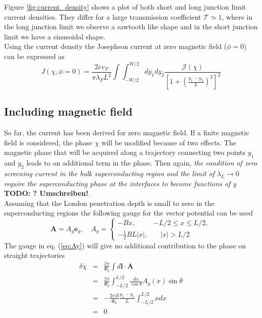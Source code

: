 Figure \ref{fig:current_density} shows a plot of both short and long junction limit current densities. They differ for a large transmission coefficient $\mathcal{T} \simeq 1$, where in the long junction limit we observe a sawtooth like shape and in the short junction limit we have a sinusoidal shape.\\
Using the current density the Josephson current at zero magnetic field ($\phi = 0$) can be expressed as 
\begin{equation}
J\left(\chi, \phi=0\right) = \frac{2 e v_F}{\pi \lambda_F L^2}  \int \int_{-W/2}^{W/2} d y_1 d y_2 \frac{\mathcal{J}(\chi)}{\left[ 1 + \left(\frac{y_1 - y_2}{L}\right)^2\right]^2}
\label{eq:josephson_current_zero_b}
\end{equation}
\subsection*{Including magnetic field}
So far, the current has been derived for zero magnetic field. If a finite magnetic field is considered, the phase $\chi$ will be modified because of two effects. The magnetic phase that will be acquired along a trajectory connecting two points $y_1$ and $y_2$  leads to an additional term in the phase. Then again, \textit{the condition of zero screening current in the bulk superconducting region and the limit of} $\lambda_L \rightarrow 0$ \textit{require the superconducting phase at the interfaces to become functions of y} \textbf{TODO: ? Umschreiben!}.\\
Assuming that the London penetration depth is small to zero in the superconducting regions the following gauge for the vector potential can be used
\begin{equation}
\mathbf{A}=A_y \mathbf{e}_y, \quad
A_y=\left\{ 
		\begin{array}{ll}
				-B x, & -L/2 \leq x \leq L/2, \\[0.2cm] 
				-\frac{1}{2} B L |x| , & \quad |x|>L/2
		\end{array} 
	\right.
\label{eq:Ay}
\end{equation}
The gauge in eq. (\ref{eq:Ay}) will give no additional contribution to the phase on straight trajectories
\begin{eqnarray}
\delta \chi &=& \frac{2 \pi}{\Phi_0} \int d \mathbf{l} \cdot \mathbf{A} \\
&=& \frac{2 \pi}{\Phi_0} \int_{-L/2}^{L/2} \frac{dx}{\cos \theta} A_y (x) \sin \theta \\
&=& - \frac{2 \pi B}{\Phi_0} \frac{y_2 - y_1}{L} \int_{-L/2}^{L/2} x dx \\
&=& 0
\end{eqnarray}
